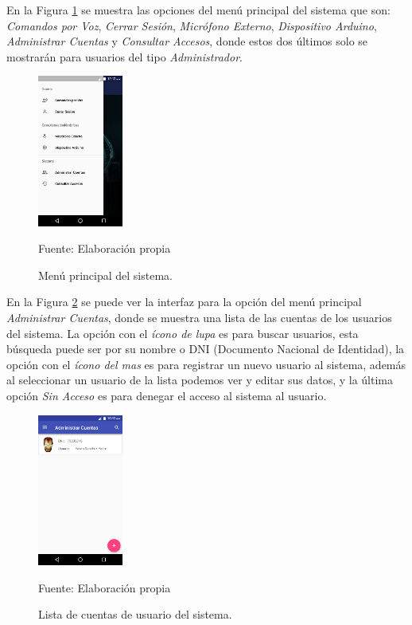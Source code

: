 En la Figura \ref{fig:figura3.39} se muestra las opciones del menú principal del sistema que son: \textit{Comandos por Voz}, \textit{Cerrar Sesión}, \textit{Micrófono Externo}, \textit{Dispositivo Arduino}, \textit{Administrar Cuentas} y \textit{Consultar Accesos}, donde estos dos últimos solo se mostrarán para usuarios del tipo \textit{Administrador}.
\begin{figure}[H]
\captionsetup{justification=centering}
\begin{center}
\includegraphics[width=0.25\textwidth]{Imagenes/Cap3/image039}
\end{center}
\begin{center}
\vskip -0.5cm
\caption{\small{Menú principal del sistema.}}
\label{fig:figura3.39}
{\small{Fuente: Elaboración propia}}
\end{center}
\end{figure}

En la Figura \ref{fig:figura3.40} se puede ver la interfaz para la opción del menú principal \textit{Administrar Cuentas}, donde se muestra una lista de las cuentas de los usuarios del sistema. La opción con el \textit{ícono de lupa} es para buscar usuarios, esta búsqueda puede ser por su nombre o DNI (Documento Nacional de Identidad), la opción con el \textit{ícono del mas} es para registrar un nuevo usuario al sistema, además al seleccionar un usuario de la lista podemos ver y editar sus datos, y la última opción \textit{Sin Acceso} es para denegar el acceso al sistema al usuario.
\begin{figure}[H]
\captionsetup{justification=centering}
\begin{center}
\includegraphics[width=0.25\textwidth]{Imagenes/Cap3/image040}
\end{center}
\begin{center}
\vskip -0.5cm
\caption{\small{Lista de cuentas de usuario del sistema.}}
\label{fig:figura3.40}
{\small{Fuente: Elaboración propia}}
\end{center}
\end{figure}

